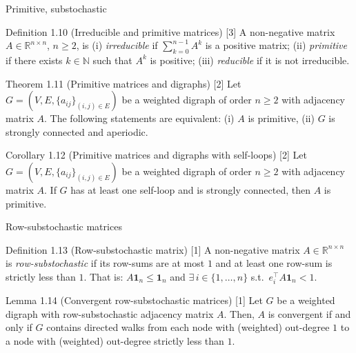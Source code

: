 \begin{frame}[label=bk-prelim2]{Primitive, substochastic}
  \scriptsize
  \begin{block}{Definition 1.10 (Irreducible and primitive matrices) [3]}
    A non-negative matrix $A \in \mathbb{R}^{n \times n}$, $n \geq 2$, is
    (i) \emph{irreducible} if $\sum_{k=0}^{n-1} A^k$ is a positive matrix;
    (ii) \emph{primitive} if there exists $k \in \mathbb{N}$ such that $A^k$ is positive;
    (iii) \emph{reducible} if it is not irreducible.
  \end{block}
  \begin{block}{Theorem 1.11 (Primitive matrices and digraphs) [2]}
    Let $G = (V, E, \{a_{ij}\}_{(i,j) \in E})$ be a weighted digraph of order $n \geq 2$
    with adjacency matrix $A$. The following statements are equivalent:
    (i) $A$ is primitive, (ii) $G$ is strongly connected and aperiodic.
  \end{block}
  \begin{block}{Corollary 1.12 (Primitive matrices and digraphs with self-loops) [2]}
    Let $G = (V, E, \{a_{ij}\}_{(i,j) \in E})$ be a weighted digraph of order $n \geq 2$
    with adjacency matrix $A$. If $G$ has at least one self-loop and is strongly connected,
    then $A$ is primitive.
  \end{block}
\end{frame}

\begin{frame}[label=bk-prelim3]{Row-substochastic matrices}
  \scriptsize
  \begin{block}{Definition 1.13 (Row-substochastic matrix) [1]}
    A non-negative matrix $A \in \mathbb{R}^{n \times n}$ is \emph{row-substochastic} if
    its row-sums are at most $1$ and at least one row-sum is strictly less than $1$. That
    is: $A \mathbf{1}_n \leq \mathbf{1}_n$ and
    $\exists\, i \in \{1, \dots, n\}$ s.t.\ $e_i^\top A \mathbf{1}_n < 1$.
  \end{block}
  \begin{block}{Lemma 1.14 (Convergent row-substochastic matrices) [1]}
    Let $G$ be a weighted digraph with row-substochastic adjacency matrix $A$. Then, $A$
    is convergent if and only if $G$ contains directed walks from each node with
    (weighted) out-degree $1$ to a node with (weighted) out-degree strictly less than $1$.
  \end{block}
\end{frame}

